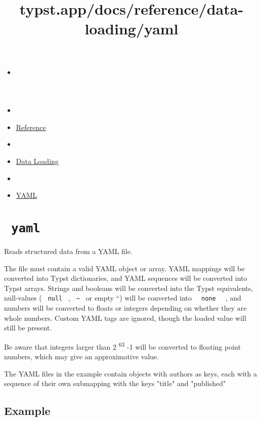\title{typst.app/docs/reference/data-loading/yaml}

\begin{itemize}
\tightlist
\item
  \href{/docs}{}
\item
  
\item
  \href{/docs/reference/}{Reference}
\item
  
\item
  \href{/docs/reference/data-loading/}{Data Loading}
\item
  
\item
  \href{/docs/reference/data-loading/yaml/}{YAML}
\end{itemize}

\section{\texorpdfstring{\texttt{\ yaml\ }}{ yaml }}\label{summary}

Reads structured data from a YAML file.

The file must contain a valid YAML object or array. YAML mappings will
be converted into Typst dictionaries, and YAML sequences will be
converted into Typst arrays. Strings and booleans will be converted into
the Typst equivalents, null-values ( \texttt{\ null\ } ,
\texttt{\ \textasciitilde{}\ } or empty ``) will be converted into
\texttt{\ }{\texttt{\ none\ }}\texttt{\ } , and numbers will be
converted to floats or integers depending on whether they are whole
numbers. Custom YAML tags are ignored, though the loaded value will
still be present.

Be aware that integers larger than 2 \textsuperscript{63} -1 will be
converted to floating point numbers, which may give an approximative
value.

The YAML files in the example contain objects with authors as keys, each
with a sequence of their own submapping with the keys "title" and
"published"

\subsection{Example}\label{example}

